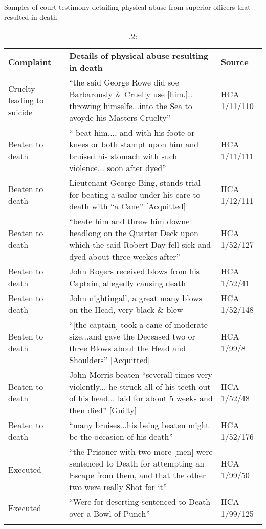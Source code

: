 \begin{table}
\caption{\label{tab:key:4}.2:} Samples of court testimony detailing physical abuse from superior officers that resulted in death
\begin{tabularx}{\textwidth}{XXX}
\lsptoprule

\textbf{Complaint} & \textbf{Details} \textbf{of} \textbf{physical} \textbf{abuse} \textbf{resulting} \textbf{in} \textbf{death} & \textbf{Source}\\
Cruelty leading to suicide & “the said George Rowe did soe Barbarously \& Cruelly use [him.].. throwing himselfe...into the Sea to avoyde his Masters Cruelty” & HCA 1/11/110\\
Beaten to death & “ beat him..., and with his foote or knees or both stampt upon him and bruised his stomach with such violence... soon after dyed” & HCA 1/11/111\\
Beaten to death & Lieutenant George Bing, stands trial for beating a sailor under his care to death with “a Cane” [Acquitted] & HCA 1/12/111\\
Beaten to death & “beate him and threw him downe headlong on the Quarter Deck upon which the said Robert Day fell sick and dyed about three weekes after” & HCA 1/52/127\\
Beaten to death & John Rogers received blows from his Captain, allegedly causing death & HCA 1/52/41\\
Beaten to death & John nightingall, a great many blows on the Head, very black \& blew & HCA 1/52/148\\
Beaten to death & “[the captain] took a cane of  moderate size...and gave the Deceased two or three Blows about the Head and Shoulders” [Acquitted] & HCA 1/99/8\\
Beaten to death & John Morris beaten “severall times very violently... he struck all of his teeth out of his head... laid for about 5 weeks and then died” [Guilty] & HCA 1/52/48\\
Beaten to death & “many bruises...his being beaten might be the occasion of his death” & HCA 1/52/176\\
Executed & “the Prisoner with two more [men] were sentenced to Death for attempting an Escape from them, and that the other two were really Shot for it” & HCA 1/99/50\\
Executed & “Were for deserting sentenced to Death over a Bowl of Punch” & HCA 1/99/125\\
\lspbottomrule
\end{tabularx}
\end{table}

